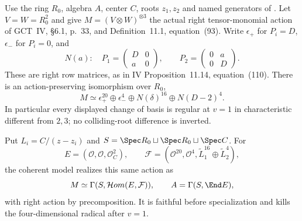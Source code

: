 \begin{finding}\label{f:r3tensor}
Use the ring $R_0$, algebra $A$, center $C$, roots $z_1,z_2$ and named
generators of . Let $V=W=R_0^2$ and give
$M=(V\otimes W)^{\otimes3}$ the actual right tensor-monomial action of
GCT~IV, \S6.1, p.~33, and Definition~11.1, equation~(93). Write
$\epsilon_+$ for $P_i=D$, $\epsilon_-$ for $P_i=0$, and
\[
 N(a):\quad P_1=\begin{pmatrix}D&0\\a&0\end{pmatrix},\qquad
 P_2=\begin{pmatrix}0&a\\0&D\end{pmatrix}.
\]
These are right row matrices, as in IV Proposition~11.14,
equation~(110). There is an action-preserving isomorphism over $R_0$,
\begin{equation}\label{eq:r3tensor}
 M\simeq\epsilon_+^{20}\oplus\epsilon_-^4
       \oplus N(\delta)^{16}\oplus N(D-2)^4.
\end{equation}
In particular every displayed change of basis is regular at $v=1$ in
characteristic different from $2,3$; no colliding-root difference is inverted.

Put $L_i=C/(z-z_i)$ and
$S=\Spec R_0\sqcup\Spec R_0\sqcup\Spec C$. For
\[
 E=(\mathcal O,\mathcal O,\mathcal O_C^2),\qquad
 \mathcal F=(\mathcal O^{20},\mathcal O^4,
             \widetilde L_1^{16}\oplus\widetilde L_2^4),
\]
the coherent model realizes this same action as
\[
 M\simeq\Gamma(S,\mathcal Hom(E,\mathcal F)),\qquad A=\Gamma(S,\End E),
\]
with right action by precomposition. It is faithful before specialization
and kills the four-dimensional radical after $v=1$.
\end{finding}
